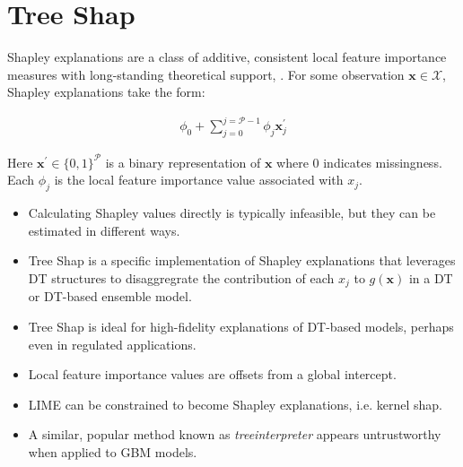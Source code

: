 \documentclass{article}
\begin{document}
\section{Tree Shap} \label{sec:shap}

Shapley explanations are a class of additive, consistent local feature importance measures with long-standing theoretical support, \cite{shapley}. For some observation $\mathbf{x} \in \mathcal{X}$, Shapley explanations take the form:

\vspace{-5pt}

\begin{equation}
\begin{aligned}
\phi_0 + \sum_{j=0}^{j=\mathcal{P} - 1} \phi_j \mathbf{x}_j^\prime
\end{aligned}
\end{equation}

Here $\mathbf{x}^\prime \in \{0,1\}^\mathcal{P}$ is a binary representation of $\mathbf{x}$ where 0 indicates missingness. Each $\phi_j$ is the local feature importance value associated with $x_j$.

\begin{itemize}
	
	\item Calculating Shapley values directly is typically infeasible, but they can be estimated in different ways.
	
	\item Tree Shap is a specific implementation of Shapley explanations that leverages DT structures to disaggregrate the contribution of each $x_j$ to $g(\mathbf{x})$ in a DT or DT-based ensemble model. \cite{tree_shap}
	
\end{itemize}

\begin{itemize}
	
	\item Tree Shap is ideal for high-fidelity explanations of DT-based models, perhaps even in regulated applications.
	
	\item Local feature importance values are offsets from a global intercept.
	
	\item LIME can be constrained to become Shapley explanations, i.e. kernel shap.
	
	\item A similar, popular method known as \textit{treeinterpreter} appears untrustworthy when applied to GBM models. 
	
\end{itemize}
\end{document}
